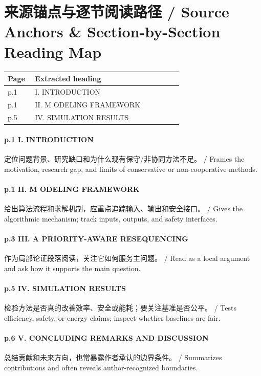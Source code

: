 \documentclass[UTF8,a4paper,11pt,fontset=fandol]{ctexart}
\begin{document}
\section{来源锚点与逐节阅读路径 / Source Anchors \& Section-by-Section Reading Map}
\begin{longtable}{p{0.14\linewidth}p{0.76\linewidth}}
\toprule
Page & Extracted heading\\
\midrule
p.1 & I. INTRODUCTION \\
p.1 & II. M ODELING FRAMEWORK \\
p.5 & IV. SIMULATION RESULTS \\
\bottomrule
\end{longtable}

\paragraph{p.1 I. INTRODUCTION}定位问题背景、研究缺口和为什么现有保守/非协同方法不足。 / Frames the motivation, research gap, and limits of conservative or non-cooperative methods.

\paragraph{p.1 II. M ODELING FRAMEWORK}给出算法流程和求解机制，应重点追踪输入、输出和安全接口。 / Gives the algorithmic mechanism; track inputs, outputs, and safety interfaces.

\paragraph{p.3 III. A PRIORITY-AWARE RESEQUENCING}作为局部论证段落阅读，关注它如何服务主问题。 / Read as a local argument and ask how it supports the main question.

\paragraph{p.5 IV. SIMULATION RESULTS}检验方法是否真的改善效率、安全或能耗；要关注基准是否公平。 / Tests efficiency, safety, or energy claims; inspect whether baselines are fair.

\paragraph{p.6 V. CONCLUDING REMARKS AND DISCUSSION}总结贡献和未来方向，也常暴露作者承认的边界条件。 / Summarizes contributions and often reveals author-recognized boundaries.
\end{document}
